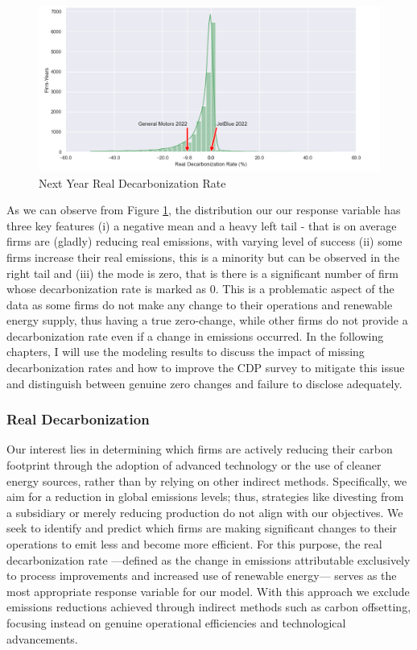 \begin{figure}[H]
    \begin{center}
    \includegraphics[width=5in]{figures/ghg_change_real_dist.png}
    \caption{Next Year Real Decarbonization Rate}
    \label{fig:next-year-real-decarbonization-rate}
    \end{center}
\end{figure}

As we can observe from Figure \ref{fig:next-year-real-decarbonization-rate}, the distribution our our response variable has three key features (i) a negative mean and a heavy left tail - that is on average firms are (gladly) reducing real emissions, with varying level of success (ii) some firms increase their real emissions, this is a minority but can be observed in the right tail and (iii) the mode is zero, that is there is a significant number of firm whose decarbonization rate is marked as $0$. This is a problematic aspect of the data as some firms do not make any change to their operations and renewable energy supply, thus having a true zero-change, while other firms do not provide a decarbonization rate even if a change in emissions occurred. In the following chapters, I will use the modeling results to discuss the impact of missing decarbonization rates and how to improve the CDP survey to mitigate this issue and distinguish between genuine zero changes and failure to disclose adequately.

\subsubsection{Real Decarbonization}

Our interest lies in determining which firms are actively reducing their carbon footprint through the adoption of advanced technology or the use of cleaner energy sources, rather than by relying on other indirect methods. Specifically, we aim for a reduction in global emissions levels; thus, strategies like divesting from a subsidiary or merely reducing production do not align with our objectives. We seek to identify and predict which firms are making significant changes to their operations to emit less and become more efficient. For this purpose, the real decarbonization rate —defined as the change in emissions attributable exclusively to process improvements and increased use of renewable energy— serves as the most appropriate response variable for our model. With this approach we exclude emissions reductions achieved through indirect methods such as carbon offsetting, focusing instead on genuine operational efficiencies and technological advancements.


